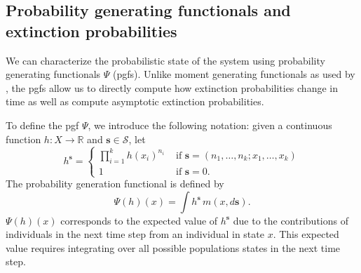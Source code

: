 \documentclass[12pt]{amsart}\usepackage[]{graphicx}\usepackage[]{color}
\def\R{\mathbb R}
\def\S{\mathcal S}
\def\s{\mathbf s}
\begin{document}
\subsection*{Probability generating functionals and extinction probabilities}

We can characterize the probabilistic state of the system using probability generating functionals $\Psi$ (pgfs). Unlike moment generating functionals as used by \citet{harris-63}, the pgfs allow us to directly compute how extinction probabilities change in time as well as compute asymptotic extinction probabilities.

To define the pgf $\Psi$, we introduce the following notation: given a continuous function $h:X\to\R$ and $\s\in \S$, let
\[
h^\s=
\left\{
\begin{array}{cc}
\prod_{i=1}^k h(x_i)^{n_i}&\mbox{ if }\s=(n_1,\dots,n_k;x_1,\dots,x_k)\\
1 &\mbox{ if }\s=0.
\end{array}
\right.
\]
The probability generation functional is defined by
\begin{equation}\label{*}
\Psi(h)(x)=\int h^\s \,m(x,d\s).
\end{equation}
$\Psi(h)(x)$ corresponds to the expected value of $h^\s$ due to the contributions of individuals in the next time step from an individual in state $x$. This expected value requires integrating over all possible populations states in the next time step.
\end{document}
